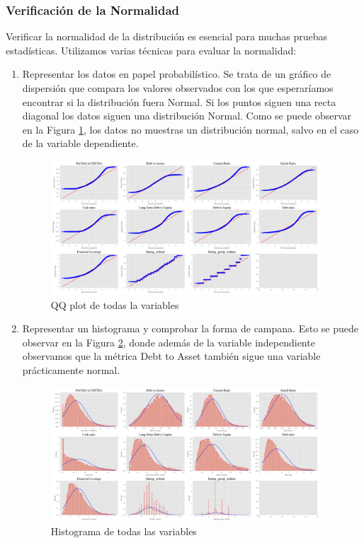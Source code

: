 \documentclass{article}
\begin{document}
\subsubsection{Verificación de la Normalidad}
Verificar la normalidad de la distribución es esencial para muchas pruebas estadísticas. Utilizamos varias técnicas para evaluar la normalidad:

\begin{enumerate}
    \item Representar los datos en papel probabilístico. Se trata de un gráfico de dispersión que compara los valores observados con los que esperaríamos encontrar si la distribución fuera Normal. Si los puntos siguen una recta diagonal los datos siguen una distribución Normal. Como se puede observar en la Figura \ref{fig:qqplot}, los datos no muestras un distribución normal, salvo en el caso de la variable dependiente. 
    
    \begin{figure}
    \centering
    \includegraphics[width=0.95\textwidth]{qqplot.png}
    \caption{QQ plot de todas la variables}
    \label{fig:qqplot}
    \end{figure}
    
    \item Representar un histograma y comprobar la forma de campana. Esto se puede observar en la Figura \ref{fig:histogram}, donde además de la variable independiente observamos que la métrica Debt to Asset también sigue una variable prácticamente normal.

    \begin{figure}
    \centering
    \includegraphics[width=0.95\textwidth]{histogram.png}
    \caption{Histograma de todas las variables}
    \label{fig:histogram}
    \end{figure}
    

\end{enumerate}
\end{document}
